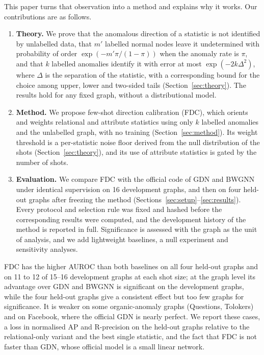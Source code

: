 \documentclass[pdflatex,sn-mathphys-ay]{sn-jnl}
\theoremstyle{plain}
\theoremstyle{remark}
\begin{document}
This paper turns that observation into a method and explains why it works. Our contributions are as follows.
\begin{enumerate}
\item \textbf{Theory.} We prove that the anomalous direction of a statistic is not identified by unlabelled data, that $m'$ labelled normal nodes leave it undetermined with probability of order $\exp(-m'\pi/(1-\pi))$ when the anomaly rate is $\pi$, and that $k$ labelled anomalies identify it with error at most $\exp(-2k\Delta^2)$, where $\Delta$ is the separation of the statistic, with a corresponding bound for the choice among upper, lower and two-sided tails (Section~\ref{sec:theory}). The results hold for any fixed graph, without a distributional model.
\item \textbf{Method.} We propose few-shot direction calibration (FDC), which orients and weights relational and attribute statistics using only $k$ labelled anomalies and the unlabelled graph, with no training (Section~\ref{sec:method}). Its weight threshold is a per-statistic noise floor derived from the null distribution of the shots (Section~\ref{sec:theory}), and its use of attribute statistics is gated by the number of shots.
\item \textbf{Evaluation.} We compare FDC with the official code of GDN \citep{ding2021few} and BWGNN \citep{tang2022rethinking} under identical supervision on 16 development graphs, and then on four held-out graphs after freezing the method (Sections~\ref{sec:setup}--\ref{sec:results}). Every protocol and selection rule was fixed and hashed before the corresponding results were computed, and the development history of the method is reported in full. Significance is assessed with the graph as the unit of analysis, and we add lightweight baselines, a null experiment and sensitivity analyses.
\end{enumerate}

FDC has the higher AUROC than both baselines on all four held-out graphs and on 11 to 12 of 15--16 development graphs at each shot size; at the graph level its advantage over GDN and BWGNN is significant on the development graphs, while the four held-out graphs give a consistent effect but too few graphs for significance. It is weaker on some organic-anomaly graphs (Questions, Tolokers) and on Facebook, where the official GDN is nearly perfect. We report these cases, a loss in normalised AP and R-precision on the held-out graphs relative to the relational-only variant and the best single statistic, and the fact that FDC is not faster than GDN, whose official model is a small linear network.
\end{document}
